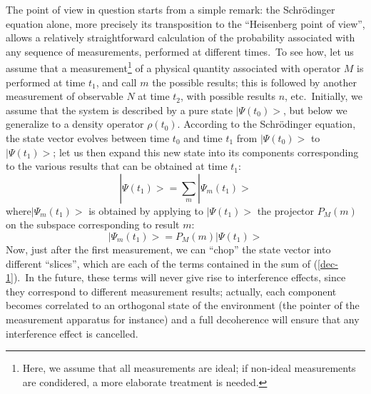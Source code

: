 \documentclass[12pt,onecolumn]{article}%
\begin{document}
The point of view in question starts from a simple remark: the Schr\"{o}dinger
equation alone, more precisely its transposition to the ``Heisenberg point of
view'', allows a relatively straightforward calculation of the probability
associated with any sequence of measurements, performed at different
times.\ To see how, let us assume that a measurement\footnote{Here, we assume
that all measurements are ideal; if non-ideal measurements are condidered, a
more elaborate treatment is needed.} of a physical quantity associated with
operator $M$ is performed at time $t_{1}$, and call $m$ the possible results;
this is followed by another measurement of observable $N$ at time $t_{2}$,
with possible results $n$, etc.\ Initially, we assume that the system is
described by a pure state $|\Psi(t_{0})>$, but below we generalize to a
density operator $\rho(t_{0})$. According to the Schr\"{o}dinger equation, the
state vector evolves between time $t_{0}$ and time $t_{1}$ from $|
\Psi(t_{0})>$ to $|\Psi(t_{1})>$; let us then expand this new state into
its components corresponding to the various results that can be obtained at
time $t_{1}$:%
\begin{equation}
|\Psi(t_{1})>=\sum_{m}|\Psi_{m}(t_{1})> \label{dec-1}%
\end{equation}
where$|\Psi_{m}(t_{1})>$ is obtained by applying to $|\Psi(t_{1})>$ the
projector $P_{M}(m)$ on the subspace corresponding to result $m$:
\begin{equation}
|\Psi_{m}(t_{1})>=P_{M}(m)|\Psi(t_{1})> \label{dec-2}%
\end{equation}
Now, just after the first measurement, we can ``chop'' the state vector into
different ``slices'', which are each of the terms contained in the sum of
(\ref{dec-1}).\ In the future, these terms will never give rise to
interference effects, since they correspond to different measurement results;
actually, each component becomes correlated to an orthogonal state of the
environment (the pointer of the measurement apparatus for instance) and a full
decoherence will ensure that any interference effect is cancelled.
\end{document}
